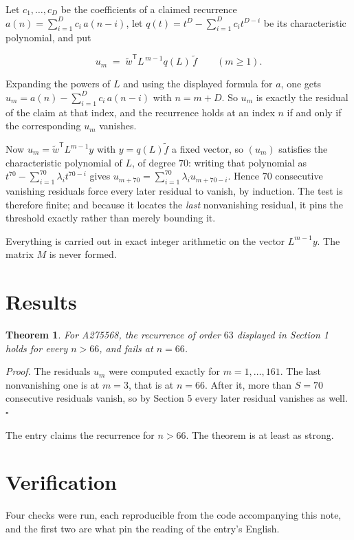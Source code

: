 \documentclass[11pt]{article}
\newtheorem{theorem}{Theorem}
\theoremstyle{definition}
\begin{document}
Let $c_1,\dots,c_D$ be the coefficients of a claimed recurrence $a(n) = \sum_{i=1}^{D} c_i\,a(n-i)$, let $q(t) = t^{D} - \sum_{i=1}^{D} c_i t^{D-i}$ be its characteristic polynomial, and put

\[u_m \;=\; \tilde w^{\mathsf T} L^{\,m-1} q(L)\,\tilde f \qquad (m \ge 1).\]

Expanding the powers of $L$ and using the displayed formula for $a$, one gets $u_m = a(n) - \sum_{i=1}^{D} c_i\,a(n-i)$ with $n = m + D$. So $u_m$ is exactly the residual of the claim at that index, and the recurrence holds at an index $n$ if and only if the corresponding $u_m$ vanishes.

Now $u_m = \tilde w^{\mathsf T} L^{m-1} y$ with $y = q(L)\tilde f$ a fixed vector, so $(u_m)$ satisfies the characteristic polynomial of $L$, of degree $70$: writing that polynomial as $t^{70} - \sum_{i=1}^{70} \lambda_i t^{70-i}$ gives $u_{m+70} = \sum_{i=1}^{70} \lambda_i u_{m+70-i}$. Hence $70$ consecutive vanishing residuals force every later residual to vanish, by induction. The test is therefore finite; and because it locates the {\itshape last} nonvanishing residual, it pins the threshold exactly rather than merely bounding it.

Everything is carried out in exact integer arithmetic on the vector $L^{m-1}y$. The matrix $M$ is never formed.

\section{Results}

\begin{theorem} For A275568, the recurrence of order $63$ displayed in Section 1 holds for every $n > 66$, and fails at $n = 66$.\end{theorem}

{\itshape Proof.} The residuals $u_m$ were computed exactly for $m = 1,\dots,161$. The last nonvanishing one is at $m = 3$, that is at $n = 66$. After it, more than $S = 70$ consecutive residuals vanish, so by Section 5 every later residual vanishes as well. $\square$

The entry claims the recurrence for $n > 66$. The theorem is at least as strong.

\section{Verification}

Four checks were run, each reproducible from the code accompanying this note, and the first two are what pin the reading of the entry's English.
\end{document}
